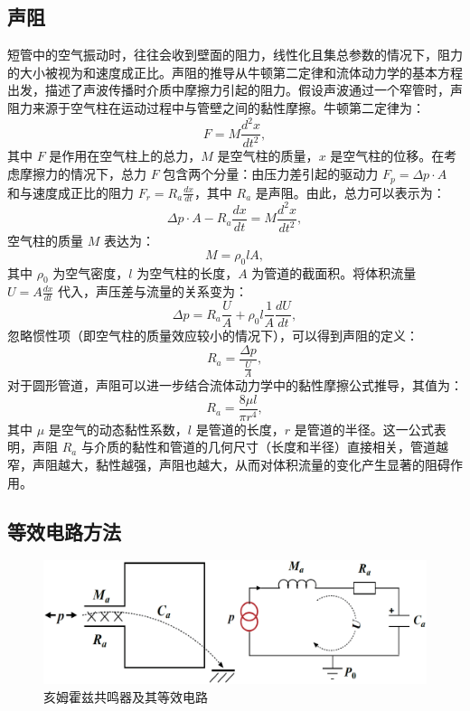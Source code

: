 \subsection{声阻}
短管中的空气振动时，往往会收到壁面的阻力，线性化且集总参数的情况下，阻力的大小被视为和速度成正比。声阻的推导从牛顿第二定律和流体动力学的基本方程出发，描述了声波传播时介质中摩擦力引起的阻力。假设声波通过一个窄管时，声阻力来源于空气柱在运动过程中与管壁之间的黏性摩擦。牛顿第二定律为：
\begin{equation} \label{eq2-19}
  F = M \frac{d^2 x}{dt^2},
\end{equation}
其中 \( F \) 是作用在空气柱上的总力，\( M \) 是空气柱的质量，\( x \) 是空气柱的位移。在考虑摩擦力的情况下，总力 \( F \) 包含两个分量：由压力差引起的驱动力 \( F_p = \Delta p \cdot A \) 和与速度成正比的阻力 \( F_r = R_a \frac{dx}{dt} \)，其中 \( R_a \) 是声阻。由此，总力可以表示为：
\begin{equation} \label{eq2-20}
  \Delta p \cdot A - R_a \frac{dx}{dt} = M \frac{d^2 x}{dt^2},
\end{equation}
空气柱的质量 \( M \) 表达为：
\begin{equation} \label{eq2-21}
  M = \rho_0 l A,
\end{equation}
其中 \( \rho_0 \) 为空气密度，\( l \) 为空气柱的长度，\( A \) 为管道的截面积。将体积流量 \( U = A \frac{dx}{dt} \) 代入，声压差与流量的关系变为：
\begin{equation} \label{eq2-22}
  \Delta p = R_a \frac{U}{A} + \rho_0 l \frac{1}{A} \frac{dU}{dt},
\end{equation}
忽略惯性项（即空气柱的质量效应较小的情况下），可以得到声阻的定义：
\begin{equation} \label{eq2-23}
  R_a = \frac{\Delta p}{\frac{U}{A}},
\end{equation}
对于圆形管道，声阻可以进一步结合流体动力学中的黏性摩擦公式推导，其值为：
\begin{equation} \label{eq2-24}
  R_a = \frac{8 \mu l}{\pi r^4},
\end{equation}
其中 \( \mu \) 是空气的动态黏性系数，\( l \) 是管道的长度，\( r \) 是管道的半径。这一公式表明，声阻 \( R_a \) 与介质的黏性和管道的几何尺寸（长度和半径）直接相关，管道越窄，声阻越大，黏性越强，声阻也越大，从而对体积流量的变化产生显著的阻碍作用。

\subsection{等效电路方法}

\begin{figure}[h!]
  \centering
  \includegraphics[width=1\textwidth]{images/fig2-3.eps} 
  \caption{亥姆霍兹共鸣器及其等效电路}
  \label{fig_2_3}
\end{figure}

